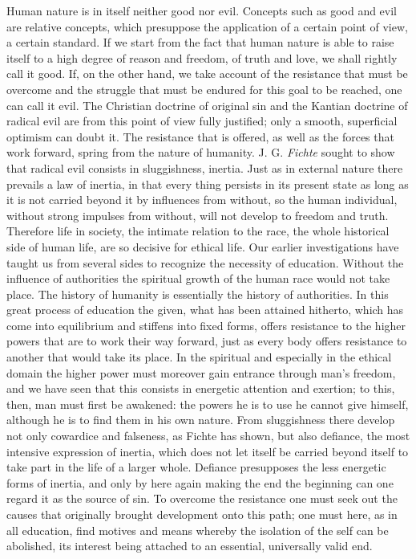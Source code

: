 \documentclass[12pt,a4paper,openany]{book}
\newcommand{\opage}[1]{\marginnote{\footnotesize\textit{[#1]}}}
\begin{document}
Human nature is in itself neither good nor evil. Concepts such as good and
evil are relative concepts, which presuppose the application of a certain
point of view, a certain standard. If we start from the fact that human
nature is able to raise itself to a high degree of reason and freedom, of
truth and love, we shall rightly call it good. If, on the other hand, we
take account of the resistance that must be overcome and the struggle that
must be endured for this goal to be reached, one can call it evil. The
Christian doctrine of original sin and the Kantian doctrine of radical evil
are from this point of view fully justified; only a smooth, superficial
optimism can doubt it. The resistance that is offered, as well as the forces %
that work forward, spring from the nature of humanity. J. G. \emph{Fichte}
sought to show that radical evil consists in sluggishness, inertia. Just as
in external nature there prevails a law of inertia, in that every thing
persists in its present state as long as it is not carried beyond it by
influences from without, so the human individual, without strong impulses
from without, will not develop to freedom and truth. Therefore life in
society, the intimate relation to the race, the whole historical side of
human life, are so decisive for ethical life. Our earlier investigations
have taught us from several sides to recognize the necessity of education.
Without the influence of \opage{144}authorities the spiritual growth of the
human race would not take place. The history of humanity is essentially the
history of authorities. In this great process of education the given, what
has been attained hitherto, which has come into equilibrium and stiffens
into fixed forms, offers resistance to the higher powers that are to work
their way forward, just as every body offers resistance to another that
would take its place. In the spiritual and especially in the ethical domain
the higher power must moreover gain entrance through man's freedom, and we
have seen that this consists in energetic attention and exertion; to this,
then, man must first be awakened: the powers he is to use he cannot give
himself, although he is to find them in his own nature. From sluggishness
there develop not only cowardice and falseness, as Fichte has shown, but
also defiance, the most intensive expression of inertia, which does not let
itself be carried beyond itself to take part in the life of a larger whole.
Defiance presupposes the less energetic forms of inertia, and only by here
again making the end the beginning can one regard it as the source of sin.
To overcome the resistance one must seek out the causes that originally
brought development onto this path; one must here, as in all education, find
motives and means whereby the isolation of the self can be abolished, its
interest being attached to an essential, universally valid end.
\end{document}
